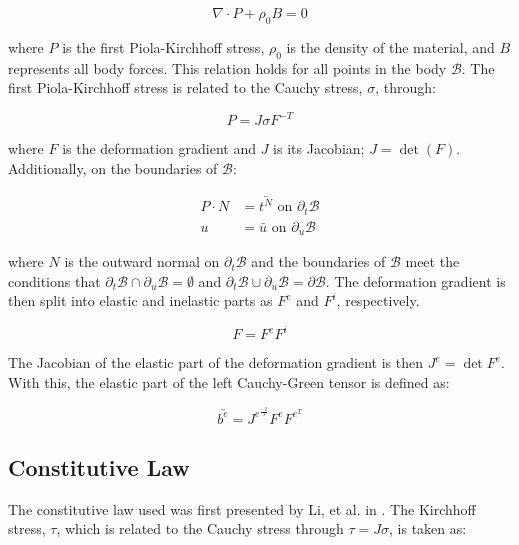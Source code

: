 \documentclass[conf]{new-aiaa}
\begin{document}
\begin{equation}
  \nabla \cdot P + \rho_0 B = 0
\end{equation}

\noindent
where $P$ is the first Piola-Kirchhoff stress, 
$\rho_0$ is the density of the material, 
and
$B$ represents all body forces.
This relation holds for all points in the body $\mathcal{B}$.
The first Piola-Kirchhoff stress is related to 
the Cauchy stress, $\sigma$, through:

\begin{equation}
  P = J \sigma F^{-T}
\end{equation}

\noindent
where $F$ is the deformation gradient and
$J$ is its Jacobian; $J=\det(F)$.
Additionally, on the boundaries of $\mathcal{B}$:

\begin{align}
  P \cdot N &= \bar{t^{N}} \text{ on } \partial_t \mathcal{B} \\
          u &= \bar{u}     \text{ on } \partial_u \mathcal{B} 
\end{align}

\noindent
where $N$ is the outward normal on $\partial_t \mathcal{B}$
and the boundaries of $\mathcal{B}$ meet the conditions 
that $\partial_t \mathcal{B} \cap \partial_u \mathcal{B} = \emptyset$
and
$\partial_t \mathcal{B} \cup \partial_u \mathcal{B} = \partial \mathcal{B}$.
The deformation gradient is then split into elastic
and inelastic parts as $F^e$ and $F^i$, respectively.

\begin{equation}
  F = F^e F^i
\end{equation}

\noindent
The Jacobian of the elastic part of the deformation gradient
is then $J^e = \det{ F^e}$. 
With this, the elastic part of the left 
Cauchy-Green tensor is defined as:

\begin{equation}
  \bar{b^e} = J^{e^{\frac{-2}{3}}} F^e F^{e^T}
\end{equation}

\subsection{Constitutive Law}
\noindent
The constitutive law used was first presented by Li, et al. in 
\cite{li_simulation_of_finite_strain_inelastic_phenomena_governed_by_creep_and_plasticity}.
The Kirchhoff stress, $\tau$, which is 
related to the Cauchy stress through $\tau = J \sigma$,
is taken as:
\end{document}
